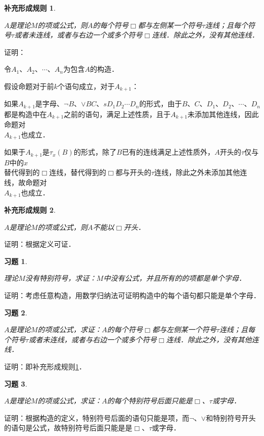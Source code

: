 \documentclass[12pt, a4paper, oneside]{book}
\newtheorem{CFcor}{补充形成规则}
\newtheorem{exer}{习题}
\begin{document}
			\begin{CFcor}\label{CFcor1}
				\hfill\par
				$A$是理论$M$的项或公式，则$A$的每个符号$\Box$都与左侧某一个符号$\tau$连线；且每个符号$\tau$或者未连线，或者与右边一个或多个符号$\Box$连线．除此之外，没有其他连线．
			\end{CFcor}
			证明：
			\par
			令$A_1$、$A_2$、$\cdots$、$A_n$为包含$A$的构造．
			\par
			假设命题对于前$k$个语句成立，对于$A_{k+1}$：
			\par
			如果$A_{k+1}$是字母、$\neg B$、$\lor BC$、$sD_1D_2\cdots D_n$的形式，由于$B$、$C$、$D_1$、$D_2$、$\cdots$、$D_n$\\都是构造中在$A_{k+1}$之前的语句，满足上述性质，且于$A_{k+1}$未添加其他连线，因此命题对\\$A_{k+1}$也成立．
			\par
			如果于$A_{k+1}$是$\tau_x(B)$的形式，除了$B$已有的连线满足上述性质外，$A$开头的$\tau$仅与$B$中的$x$\\替代得到的$\Box$连线，替代得到的$\Box$都与开头的$\tau$连线，除此之外未添加其他连线，故命题对\\$A_{k+1}$也成立．

			\begin{CFcor}\label{CFcor2}
				\hfill\par
				$A$是理论$M$的项或公式，则$A$不能以$\Box$开头．
			\end{CFcor}
			证明：根据定义可证．

			\begin{exer}\label{exer1}
				\hfill\par
				理论$M$没有特别符号，求证：$M$中没有公式，并且所有的的项都是单个字母．
			\end{exer}
			证明：考虑任意构造，用数学归纳法可证明构造中的每个语句都只能是单个字母．

			\begin{exer}\label{exer2}
				\hfill\par
				$A$是理论$M$的项或公式，求证：$A$的每个符号$\Box$都与左侧某一个符号$\tau$连线；且每个符号$\tau$或者未连线，或者与右边一个或多个符号$\Box$连线．除此之外，没有其他连线．
			\end{exer}
			证明：即补充形成规则\ref{CFcor1}．

			\begin{exer}\label{exer3}
				\hfill\par
				$A$是理论$M$的项或公式，求证：$A$的每个特别符号后面只能是$\Box$、$\tau$或字母．
			\end{exer}
			证明：根据构造的定义，特别符号后面的语句只能是项，而$\neg$、$\lor$和特别符号开头的语句是公式，故特别符号后面只能是是$\Box$、$\tau$或字母．
\end{document}
